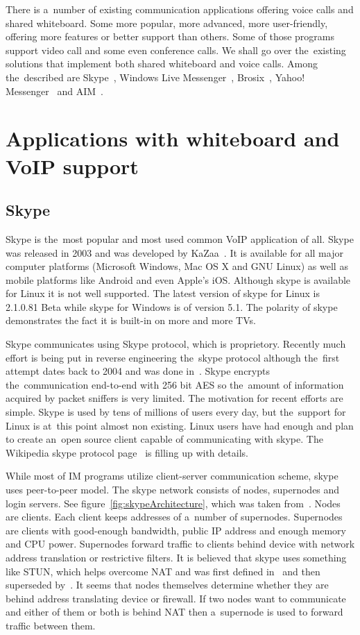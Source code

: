 There is a~number of existing communication applications offering voice calls and shared whiteboard. Some more popular, more advanced, more user-friendly, offering more features or better support than others. Some of those programs support video call and some even conference calls. We shall go over the~existing solutions that implement both shared whiteboard and voice calls. Among the~described are Skype~\cite{skype}, Windows Live Messenger~\cite{WindowsLiveMessenger}, Brosix~\cite{brosix}, Yahoo! Messenger~\cite{yahoo} and AIM~\cite{AIM}.

\section{Applications with whiteboard and VoIP support}
\subsection*{Skype}
Skype is the~most popular and most used common VoIP application of all. Skype was released in 2003 and was developed by KaZaa~\cite{kazaa}. It is available for all major computer platforms (Microsoft Windows, Mac OS X and GNU Linux) as well as mobile platforms like Android and even Apple's iOS. Although skype is available for Linux it is not well supported. The latest version of skype for Linux is 2.1.0.81 Beta while skype for Windows is of version 5.1. The polarity of skype demonstrates the fact it is built-in on more and more TVs.

Skype communicates using Skype protocol, which is proprietory. Recently much effort is being put in reverse engineering the~skype protocol although the~first attempt dates back to 2004 and was done in~\cite{skypeProtocolAnalysis}. Skype encrypts the~communication end-to-end with 256 bit AES so the~amount of information acquired by packet sniffers is very limited. The motivation for recent efforts are simple. Skype is used by tens of millions of users every day, but the~support for Linux is at~this point almost non existing. Linux users have had enough and plan to create an~open source client capable of communicating with skype. The Wikipedia skype protocol page~\cite{wikipediaSkypeProtocol} is filling up with details.  

While most of IM programs utilize client-server communication scheme, skype uses peer-to-peer model. The skype network consists of nodes, supernodes and login servers. See figure~\ref{fig:skypeArchitecture}, which was taken from~\cite{skypeProtocolAnalysis}. Nodes are clients. Each client keeps addresses of a~number of supernodes. Supernodes are clients with good-enough bandwidth, public IP address and enough memory and CPU power. Supernodes forward traffic to clients behind device with network address translation or restrictive filters. It is believed that skype uses something like STUN, which helps overcome NAT and was first defined in~\cite{STUNRFC} and then superseded by~\cite{STUNRFCNEW}. It seems that nodes themselves determine whether they are behind address translating device or firewall. If two nodes want to communicate and either of them or both is behind NAT then a~supernode is used to forward traffic between them. 

